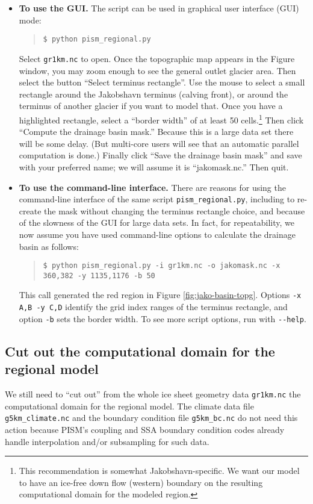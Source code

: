 \begin{itemize}
\item \textbf{To use the GUI.}  The script can be used in graphical user interface (GUI) mode:
\begin{quote}\small
\begin{verbatim}
$ python pism_regional.py
\end{verbatim}
\normalsize\end{quote}
Select \texttt{gr1km.nc} to open.  Once the topographic map appears in the Figure window, you may zoom enough to see the general outlet glacier area.  Then select the button ``Select terminus rectangle''.  Use the mouse to select a small rectangle around the Jakobshavn terminus (calving front), or around the terminus of another glacier if you want to model that.  Once you have a highlighted rectangle, select a ``border width'' of at least 50 cells.\footnote{This recommendation is somewhat Jakobshavn-specific. We want our model to have an ice-free down flow (western) boundary on the resulting computational domain for the modeled region.}  Then click ``Compute the drainage basin mask.''  Because this is a large data set there will be some delay. (But multi-core users will see that an automatic parallel computation is done.)  Finally click ``Save the drainage basin mask'' and save with your preferred name; we will assume it is ``jakomask.nc.''  Then quit.
\item \textbf{To use the command-line interface.}  There are reasons for using the command-line interface of the same script \texttt{pism_regional.py}, including to re-create the mask without changing the terminus rectangle choice, and because of the slowness of the GUI for large data sets.  In fact, for repeatability, we now assume you have used command-line options to calculate the drainage basin as follows:
\begin{quote}\small
\begin{verbatim}
$ python pism_regional.py -i gr1km.nc -o jakomask.nc -x 360,382 -y 1135,1176 -b 50
\end{verbatim}
\normalsize\end{quote}
This call generated the red region in Figure \ref{fig:jako-basin-topg}.  Options \verb|-x A,B -y C,D| identify the grid index ranges of the terminus rectangle, and option \verb|-b| sets the border width.  To see more script options, run with \verb|--help|.
\end{itemize}

\subsection*{Cut out the computational domain for the regional model}
We still need to ``cut out'' from the whole ice sheet geometry data \verb|gr1km.nc| the computational domain for the regional model.  The climate data file \texttt{g5km_climate.nc} and the boundary condition file \texttt{g5km_bc.nc} do not need this action because PISM's coupling and SSA boundary condition codes already handle interpolation and/or subsampling for such data.

